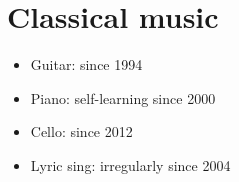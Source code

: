 \documentclass[10pt,a4paper]{moderncv}
\begin{document}
   






\section{Classical music}
\begin{itemize}
\item Guitar: since 1994
\item Piano: self-learning since 2000
\item Cello: since 2012
\item Lyric sing: irregularly since 2004
\end{itemize}
\end{document}
